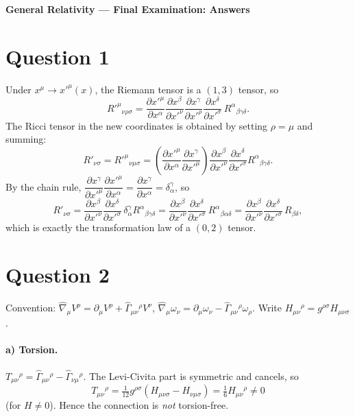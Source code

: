\documentclass[11pt]{article}
\begin{document}
\begin{center}{\bf\Large General Relativity --- Final Examination: Answers}\end{center}

\section*{Question 1}
Under $x^\mu\to x'^\mu(x)$, the Riemann tensor is a $(1,3)$ tensor, so
\[
R'^\mu{}_{\nu\rho\sigma}=\frac{\partial x'^\mu}{\partial x^\alpha}\frac{\partial x^\beta}{\partial x'^\nu}\frac{\partial x^\gamma}{\partial x'^\rho}\frac{\partial x^\delta}{\partial x'^\sigma}\,R^\alpha{}_{\beta\gamma\delta}.
\]
The Ricci tensor in the new coordinates is obtained by setting $\rho=\mu$ and summing:
\[
R'_{\nu\sigma}=R'^\mu{}_{\nu\mu\sigma}
=\left(\frac{\partial x'^\mu}{\partial x^\alpha}\frac{\partial x^\gamma}{\partial x'^\mu}\right)\frac{\partial x^\beta}{\partial x'^\nu}\frac{\partial x^\delta}{\partial x'^\sigma}R^\alpha{}_{\beta\gamma\delta}.
\]
By the chain rule, $\dfrac{\partial x^\gamma}{\partial x'^\mu}\dfrac{\partial x'^\mu}{\partial x^\alpha}=\dfrac{\partial x^\gamma}{\partial x^\alpha}=\delta^\gamma_\alpha$, so
\[
R'_{\nu\sigma}=\frac{\partial x^\beta}{\partial x'^\nu}\frac{\partial x^\delta}{\partial x'^\sigma}\,\delta^\gamma_\alpha R^\alpha{}_{\beta\gamma\delta}
=\frac{\partial x^\beta}{\partial x'^\nu}\frac{\partial x^\delta}{\partial x'^\sigma}\,R^\alpha{}_{\beta\alpha\delta}
=\frac{\partial x^\beta}{\partial x'^\nu}\frac{\partial x^\delta}{\partial x'^\sigma}\,R_{\beta\delta},
\]
which is exactly the transformation law of a $(0,2)$ tensor.

\section*{Question 2}
Convention: $\hat\nabla_\mu V^\rho=\partial_\mu V^\rho+\hat\Gamma_{\mu\nu}{}^\rho V^\nu$, $\hat\nabla_\mu \omega_\nu=\partial_\mu\omega_\nu-\hat\Gamma_{\mu\nu}{}^\rho\omega_\rho$. Write $H_{\mu\nu}{}^\rho=g^{\rho\sigma}H_{\mu\nu\sigma}$.

\paragraph{a) Torsion.} $T_{\mu\nu}{}^\rho=\hat\Gamma_{\mu\nu}{}^\rho-\hat\Gamma_{\nu\mu}{}^\rho$. The Levi-Civita part is symmetric and cancels, so
\[
T_{\mu\nu}{}^\rho=\tfrac{1}{12}g^{\rho\sigma}(H_{\mu\nu\sigma}-H_{\nu\mu\sigma})=\tfrac{1}{6}H_{\mu\nu}{}^\rho\neq0
\]
(for $H\neq0$). Hence the connection is \emph{not} torsion-free.
\end{document}
